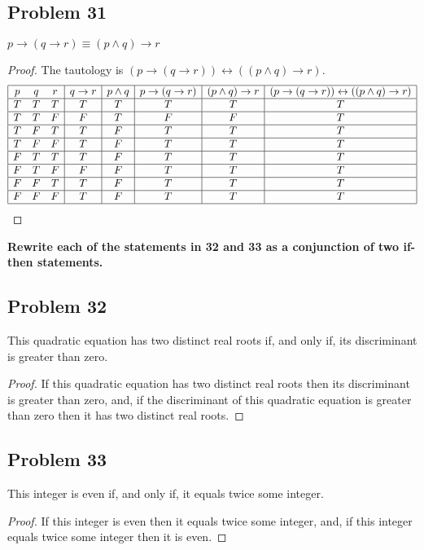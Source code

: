 \documentclass[14pt]{extarticle}
\newcommand{\bic}{\leftrightarrow}
\begin{document}
\subsection{Problem 31}
$p \to (q \to r) \equiv (p \wedge q) \to r$

\begin{proof}
The tautology is $(p \to (q \to r)) \bic ((p \wedge q) \to r)$.
$$
\begin{array}{|ccc|c|c|c|c|c|}
\hline
p & q & r & q \to r & p \wedge q & p \to (q \to r) & (p \wedge q) \to r & (p \to
(q \to r)) \bic ((p \wedge q) \to r) \\
\hline
T & T & T & T & T & T & T & T \\
\hline
T & T & F & F & T & F & F & T \\
\hline
T & F & T & T & F & T & T & T \\
\hline
T & F & F & T & F & T & T & T \\
\hline
F & T & T & T & F & T & T & T \\
\hline
F & T & F & F & F & T & T & T \\
\hline
F & F & T & T & F & T & T & T \\
\hline
F & F & F & T & F & T & T & T \\
\hline
\end{array}
$$
\end{proof}

{\bf Rewrite each of the statements in 32 and 33 as a conjunction of two if-then
statements.}

\subsection{Problem 32}
This quadratic equation has two distinct real roots if, and only if, its
discriminant is greater than zero.

\begin{proof}
If this quadratic equation has two distinct real roots then its discriminant is
greater than zero, and, if the discriminant of this quadratic equation is
greater than zero then it has two distinct real roots.
\end{proof}

\subsection{Problem 33}
This integer is even if, and only if, it equals twice some integer.

\begin{proof}
If this integer is even then it equals twice some integer, and, if this integer
equals twice some integer then it is even.
\end{proof}
\end{document}
